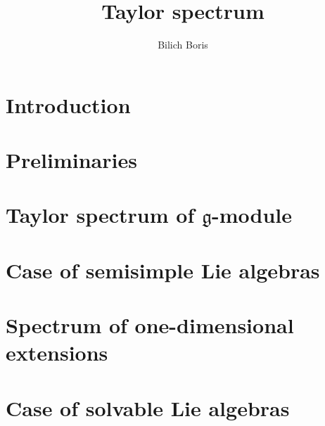 \documentclass[letterpaper]{amsart}
\author{Bilich Boris}
\title{Taylor spectrum}
\newcommand{\lieg}{\mathfrak{g}}
\begin{document}
\maketitle
\tableofcontents
\section{Introduction}%
\label{sec:introduction}


\section{Preliminaries}%
\label{sec:preliminaries}


\section{Taylor spectrum of $\lieg$-module}%
\label{sec:spectrumofmodule}


\section{Case of semisimple Lie algebras}%
\label{sec:semisimple}


\section{Spectrum of one-dimensional extensions}%
\label{sec:1extensions}


\section{Case of solvable Lie algebras}%
\label{sec:solvable}


%

%
\end{document}
